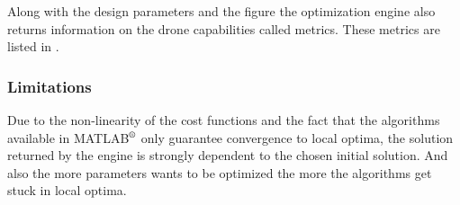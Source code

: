 Along with the design parameters and the figure the optimization engine also
returns information on the drone capabilities called metrics. These metrics are
listed in .

\begin{table}[!h]
\begin{center}
 \caption{List of the metrics returned by the optimization tool.}\vspace{1ex}
 \label{tab:tab_metrics}
\end{center}
\end{table}

\subsubsection{Limitations}
\label{sec:limitations}
Due to the non-linearity of the cost functions and the fact that the algorithms
available in MATLAB$^\textrm{\textregistered}$ only guarantee convergence
to local optima, the solution returned by the engine is strongly dependent to the
chosen initial solution. And also the more parameters wants to be optimized the
more the algorithms get stuck in local optima.

